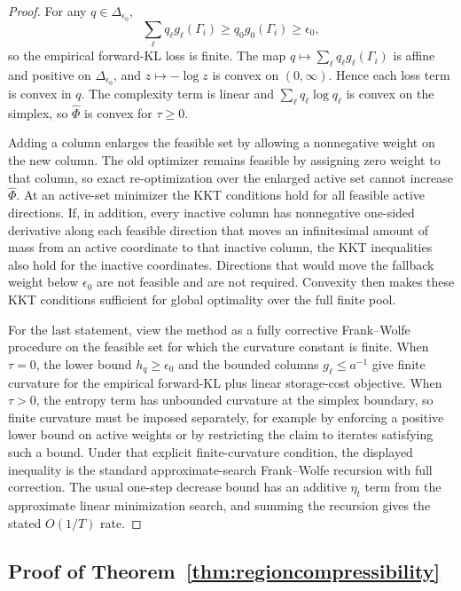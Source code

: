 \documentclass[twoside,11pt]{article}
\begin{document}
\begin{proof} For any $q\in\Delta_{\epsilon_0}$,
\[
\sum_\ell q_\ell g_\ell(\Gamma_i) \ge q_0g_0(\Gamma_i) \ge \epsilon_0,
\]
so the empirical forward-KL loss is finite. The map $q\mapsto\sum_\ell q_\ell g_\ell(\Gamma_i)$ is affine and positive on $\Delta_{\epsilon_0}$, and $z\mapsto-\log z$ is convex on $(0,\infty)$. Hence each loss term is convex in $q$. The complexity term is linear and $\sum_\ell q_\ell\log q_\ell$ is convex on the simplex, so $\widehat\Phi$ is convex for $\tau\ge0$.

Adding a column enlarges the feasible set by allowing a nonnegative weight on the new column. The old optimizer remains feasible by assigning zero weight to that column, so exact re-optimization over the enlarged active set cannot increase \(\widehat\Phi\). At an active-set minimizer the KKT conditions hold for all feasible active directions. If, in addition, every inactive column has nonnegative one-sided derivative along each feasible direction that moves an infinitesimal amount of mass from an active coordinate to that inactive column, the KKT inequalities also hold for the inactive coordinates. Directions that would move the fallback weight below \(\epsilon_0\) are not feasible and are not required. Convexity then makes these KKT conditions sufficient for global optimality over the full finite pool.

For the last statement, view the method as a fully corrective Frank--Wolfe procedure on the feasible set for which the curvature constant is finite. When \(\tau=0\), the lower bound \(h_q\ge\epsilon_0\) and the bounded columns \(g_\ell\le a^{-1}\) give finite curvature for the empirical forward-KL plus linear storage-cost objective. When \(\tau>0\), the entropy term has unbounded curvature at the simplex boundary, so finite curvature must be imposed separately, for example by enforcing a positive lower bound on active weights or by restricting the claim to iterates satisfying such a bound. Under that explicit finite-curvature condition, the displayed inequality is the standard approximate-search Frank--Wolfe recursion with full correction. The usual one-step decrease bound has an additive \(\eta_t\) term from the approximate linear minimization search, and summing the recursion gives the stated \(O(1/T)\) rate.
\end{proof}

\subsection{Proof of Theorem~\ref{thm:regioncompressibility}}
\end{document}
